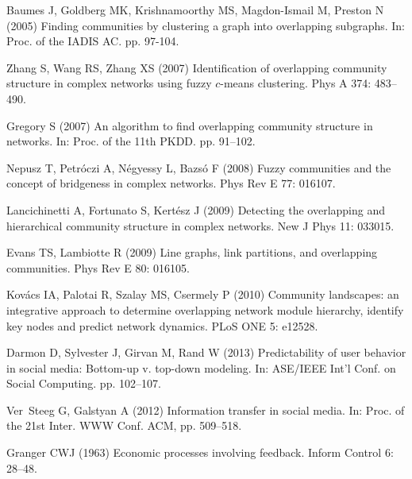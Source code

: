 \documentclass[10pt,letterpaper]{article}
\begin{document}
\begin{thebibliography}{10}
Baumes J, Goldberg MK, Krishnamoorthy MS, Magdon-Ismail M, Preston N (2005)
  Finding communities by clustering a graph into overlapping subgraphs.
\newblock In: Proc. of the IADIS AC. pp. 97-104.

Zhang S, Wang RS, Zhang XS (2007) Identification of overlapping community
  structure in complex networks using fuzzy $c$-means clustering.
\newblock Phys A 374: 483--490.

Gregory S (2007) An algorithm to find overlapping community structure in
  networks.
\newblock In: Proc. of the 11th PKDD. pp. 91--102.

Nepusz T, Petr\'oczi A, N\'egyessy L, Bazs\'o F (2008) Fuzzy communities and
  the concept of bridgeness in complex networks.
\newblock Phys Rev E 77: 016107.

Lancichinetti A, Fortunato S, Kert\'{e}sz J (2009) {Detecting the overlapping
  and hierarchical community structure in complex networks}.
\newblock New J Phys 11: 033015.

Evans TS, Lambiotte R (2009) Line graphs, link partitions, and overlapping
  communities.
\newblock Phys Rev E 80: 016105.

Kov\'{a}cs IA, Palotai R, Szalay MS, Csermely P (2010) Community landscapes: an
  integrative approach to determine overlapping network module hierarchy,
  identify key nodes and predict network dynamics.
\newblock PLoS ONE 5: e12528.

Darmon D, Sylvester J, Girvan M, Rand W (2013) Predictability of user behavior
  in social media: Bottom-up v. top-down modeling.
\newblock In: ASE/IEEE Int'l Conf. on Social Computing. pp. 102--107.

Ver~Steeg G, Galstyan A (2012) Information transfer in social media.
\newblock In: Proc. of the 21st Inter. WWW Conf. ACM, pp. 509--518.

Granger CWJ (1963) Economic processes involving feedback.
\newblock Inform Control 6: 28--48.


\end{thebibliography}
\end{document}
